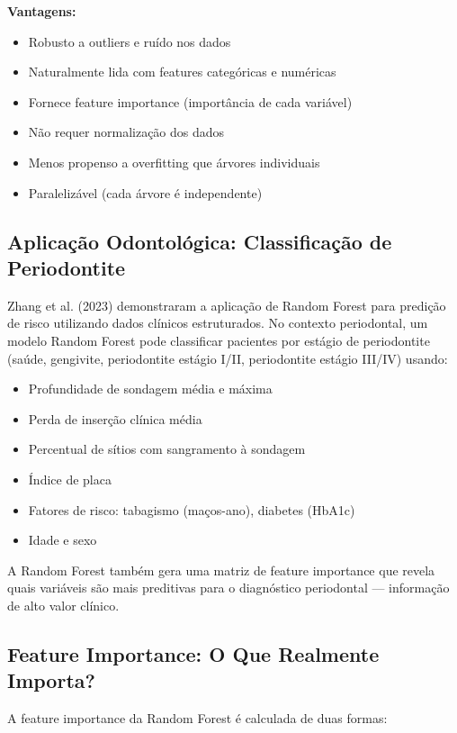\textbf{Vantagens:}
\begin{itemize}
    \item Robusto a outliers e ruído nos dados
    \item Naturalmente lida com features categóricas e numéricas
    \item Fornece feature importance (importância de cada variável)
    \item Não requer normalização dos dados
    \item Menos propenso a overfitting que árvores individuais
    \item Paralelizável (cada árvore é independente)
\end{itemize}

\subsection{Aplicação Odontológica: Classificação de Periodontite}

Zhang et al. (2023) \cite{ODT-025} demonstraram a aplicação de Random Forest para predição de risco utilizando dados clínicos estruturados. No contexto periodontal, um modelo Random Forest pode classificar pacientes por estágio de periodontite (saúde, gengivite, periodontite estágio I/II, periodontite estágio III/IV) usando:

\begin{itemize}
    \item Profundidade de sondagem média e máxima
    \item Perda de inserção clínica média
    \item Percentual de sítios com sangramento à sondagem
    \item Índice de placa
    \item Fatores de risco: tabagismo (maços-ano), diabetes (HbA1c)
    \item Idade e sexo
\end{itemize}

A Random Forest também gera uma matriz de feature importance que revela quais variáveis são mais preditivas para o diagnóstico periodontal — informação de alto valor clínico.

\subsection{Feature Importance: O Que Realmente Importa?}

A feature importance  da Random Forest é calculada de duas formas:

